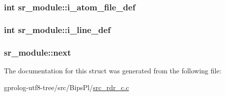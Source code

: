\subsubsection[{\texorpdfstring{i\+\_\+atom\+\_\+file\+\_\+def}{i_atom_file_def}}]{\setlength{\rightskip}{0pt plus 5cm}int sr\+\_\+module\+::i\+\_\+atom\+\_\+file\+\_\+def}\hypertarget{structsr__module_a2c69e68be4245afea2ed7d5a69650166}{}\label{structsr__module_a2c69e68be4245afea2ed7d5a69650166}
\subsubsection[{\texorpdfstring{i\+\_\+line\+\_\+def}{i_line_def}}]{\setlength{\rightskip}{0pt plus 5cm}int sr\+\_\+module\+::i\+\_\+line\+\_\+def}\hypertarget{structsr__module_a931a2655c0576f16e2776c5c7ac2cf0a}{}\label{structsr__module_a931a2655c0576f16e2776c5c7ac2cf0a}
\subsubsection[{\texorpdfstring{next}{next}}]{ sr\+\_\+module\+::next}\hypertarget{structsr__module_af8c9ce6870c7f7558096b050d6df683b}{}\label{structsr__module_af8c9ce6870c7f7558096b050d6df683b}


The documentation for this struct was generated from the following file\+:\begin{DoxyCompactItemize}
\item 
gprolog-\/utf8-\/tree/src/\+Bips\+Pl/\hyperlink{src__rdr__c_8c}{src\+\_\+rdr\+\_\+c.\+c}\end{DoxyCompactItemize}
